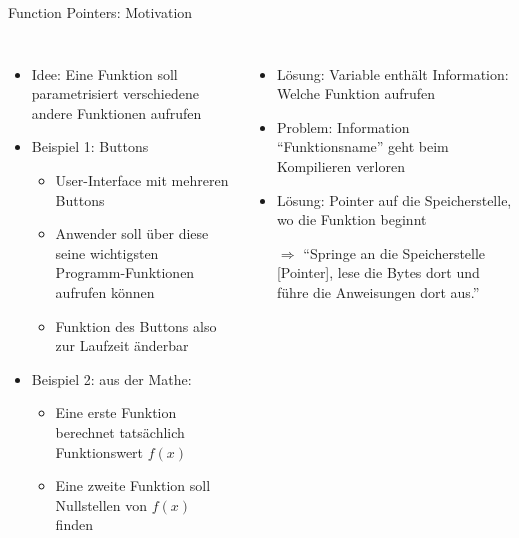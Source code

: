 \begin{frame}[fragile]{Function Pointers: Motivation}
%
\begin{columns}[T]
\begin{itemize}
\item Idee: Eine Funktion soll parametrisiert verschiedene andere Funktionen aufrufen
\item Beispiel 1: Buttons
	\begin{itemize}
	\item User-Interface mit mehreren Buttons
	\item Anwender soll über diese seine wichtigsten Programm-Funktionen aufrufen können
	\item Funktion des Buttons also zur Laufzeit änderbar
	\end{itemize}
\item Beispiel 2: aus der Mathe:
	\begin{itemize}
	\item Eine erste Funktion berechnet tatsächlich Funktionswert $f(x)$
	\item Eine zweite Funktion soll Nullstellen von $f(x)$ finden
	\end{itemize}

\end{itemize}
%
\begin{itemize}
\item Lösung: Variable enthält Information: Welche Funktion aufrufen
\item Problem: Information \enquote{Funktionsname} geht beim Kompilieren verloren
\item Lösung: Pointer auf die Speicherstelle, wo die Funktion beginnt
\item[$\Rightarrow$] \enquote{Springe an die Speicherstelle [Pointer], lese die Bytes dort und führe die Anweisungen dort aus.}
\end{itemize}
\end{columns}
%
\end{frame}


